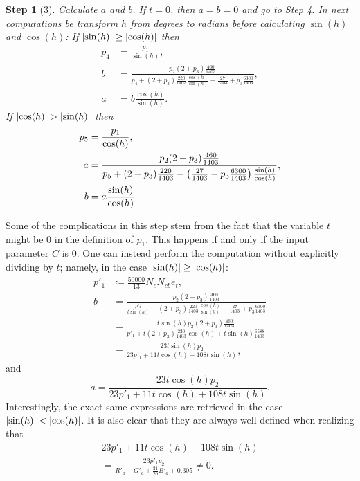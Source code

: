 \documentclass[twocolumn]{scrartcl}
\theoremstyle{named}
\newtheorem*{step}{Step}
\DeclarePairedDelimiter\abs{\lvert}{\rvert}%
\begin{document}
\begin{step}[3]
Calculate $a$ and $b$.
If $t=0$, then $a=b=0$ and go to Step 4.
In next computations be transform $h$ from degrees to radians
before calculating $\sin(h)$ and $\cos(h)$:
If $\abs{\sin(h)} \ge \abs{\cos(h)}$ then
\begin{align*}
  p_4 &= \frac{p_1}{\sin(h)},\\
  b &= \frac{p_2 (2+p_3) \frac{460}{1403}}{p_4 + (2+p_3) \frac{220}{1403} \frac{\cos(h)}{\sin(h)} - \frac{27}{1403} + p_3 \frac{6300}{1403}},\\
  a &= b \frac{\cos(h)}{\sin(h)}.
\end{align*}
If $\abs{\cos(h)} > \abs{\sin(h)}$ then
\begin{align*}
  p_5 &= \frac{p_1}{\cos(h)},\\
  a &= \frac{p_2 (2+p_3) \frac{460}{1403}}{%
    p_5
    + (2+p_3) \frac{220}{1403} -
    \left(\frac{27}{1403}  - p_3 \frac{6300}{1403}\right) \frac{\sin(h)}{\cos(h)}
  },\\
  b &= a \frac{\sin(h)}{\cos(h)}.
\end{align*}
\end{step}

Some of the complications in this step stem from the fact that the variable $t$
might be $0$ in the definition of $p_1$. This happens if and only if the input
parameter $C$ is $0$.
One can instead perform the computation without explicitly dividing by $t$;
namely, in the case $\abs{\sin(h)} \ge \abs{\cos(h)}$:
\begin{align*}
  p'_1 &\coloneqq \frac{50000}{13} N_c N_{cb} e_t,\\
  b &= \frac{p_2 (2+p_3) \frac{460}{1403}}{\frac{p'_1}{t\sin(h)} + (2+p_3) \frac{220}{1403} \frac{\cos(h)}{\sin(h)} - \frac{27}{1403} + p_3 \frac{6300}{1403}}\\
   &= \frac{t \sin(h) p_2 (2+p_3) \frac{460}{1403}}{p'_1 + t (2+p_3) \frac{220}{1403} \cos(h) + t \sin(h) \frac{6588}{1403}}\\
   &= \frac{23 t \sin(h) p_2}{23 p'_1 + 11 t \cos(h) + 108 t \sin(h)},
\end{align*}
and
\[
  a = \frac{23 t \cos(h) p_2}{23 p'_1 + 11 t \cos(h) + 108 t \sin(h)}.
\]
Interestingly, the exact same expressions are retrieved in the case
$\abs{\sin(h)} < \abs{\cos(h)}$.
It is also clear that they are always well-defined when realizing that
\begin{multline*}
  23 p'_1 + 11 t \cos(h) + 108 t \sin(h)\\
  = \frac{23 p'_1 p_2}{R'_a + G'_a + \tfrac{21}{20}B'_a + 0.305}
  \neq 0.
\end{multline*}
\end{document}
